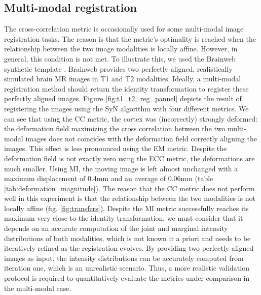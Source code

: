 

\subsection{Multi-modal registration}
The cross-correlation metric is occasionally used for some multi-modal image registration tasks. The reason is that the
metric's optimality is reached when the relationship between the two image modalities is locally affine. However, in general, this condition is not met. To illustrate this,
we used the Brainweb synthetic template \cite{Cocosco1997}\cite{Kwan1999}. Brainweb provides two perfectly aligned, realistically simulated brain MR images in T1 and T2 modalities.
Ideally, a multi-modal registration method should return the identity transformation to register these perfectly aligned images.
Figure \ref{fig:t1_t2_reg_pannel} depicts the result of registering the images using the SyN algorithm with four different metrics. We can see that using the CC metric,
the cortex was (incorrectly) strongly deformed: the deformation field maximizing the cross correlation between the two multi-modal images does not coincides with the deformation field correctly aligning the images. This effect is less pronounced using the EM metric. Despite the deformation field is not exactly zero using the ECC metric, the deformations
are much smaller. Using MI, the moving image is left almost unchanged with a maximum displacement of 0.4mm and an average of 0.06mm (table \ref{tab:deformation_magnitude}). The reason that the CC metric does not perform well in this experiment is that the relationship between the two modalities is not locally affine (fig. \ref{fig:transfers}). Despite the MI metric successfully reaches its maximum very close to the identity transformation, we must consider that it depends on an accurate computation of the joint and marginal intensity distributions of both modalities, which is not known {it a priori} and needs to be iteratively refined as the registration evolves. By providing two perfectly aligned images as input, the intensity distributions can be accurately computed from iteration one, which is an unrealistic scenario. Thus, a more realistic validation protocol is required to quantitatively evaluate the metrics under comparison in the multi-modal case.

